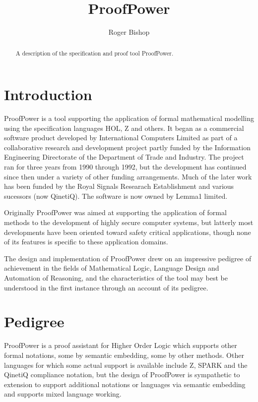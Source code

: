 \documentclass{rbjk}
\begin{document}
                                                                                   
\begin{article}
\begin{opening}  
\title{ProofPower}
\author{Roger Bishop }

\begin{abstract}
A description of the specification and proof tool ProofPower.
\end{abstract}
\end{opening}

\tableofcontents

\section{Introduction}

ProofPower is a tool supporting the application of formal mathematical
modelling using the specification languages HOL, Z and others.
It began as a commercial software product developed by International
Computers Limited as part of a collaborative research and development
project partly funded by the Information Engineering Directorate of the
Department of Trade and Industry.
The project ran for three years from 1990 through 1992, but the
development has continued since then under a variety of other funding
arrangements.
Much of the later work has been funded by the Royal Signals Researach
Establishment and various sucessors (now QinetiQ).
The software is now owned by Lemma1 limited.

Originally ProofPower was aimed at supporting the application of
formal methods to the development of highly secure computer systems,
but latterly most developments have been oriented toward safety
critical applications, though none of its features is specific to
these application domains.

The design and implementation of ProofPower drew on an impressive
pedigree of achievement in the fields of Mathematical Logic, Language
Design and Automation of Reasoning, and the characteristics of the
tool may best be understood in the first instance through an account
of its pedigree.

\section{Pedigree}

ProofPower is a proof assistant for Higher Order Logic which supports
other formal notations, some by semantic embedding, some by other
methods.
Other languages for which some actual support is available include Z,
SPARK and the QinetiQ compliance notation, but the design of
ProofPower is sympathetic to extension to support additional notations
or languages via semantic embedding and supports mixed language working.


\end{article}
\end{document}
